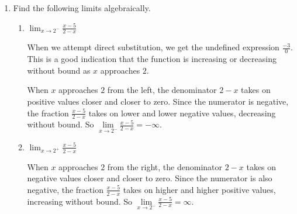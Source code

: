 \documentclass{article}
\begin{document}
\begin{enumerate}[resume]
\begin{solution}
    When $x<0$, as $x$ takes on values closer and closer to zero,
    $\frac{1}{x}$ takes on lower and lower negative values, decreasing without bound.
    This tells us that $\lim\limits_{x \to 0^-} \frac{1}{x} = -\infty$.

    Since $\frac{1}{x}$ increases without bound as $x$ approaches zero from the right and 
    decreases without bound as $x$ approaches zero from the left,
    $\lim\limits_{x \to 0} \frac{1}{x}$ does not exist.
    
  \end{solution}

\item 

  Find the following limits algebraically.

    \begin{enumerate}
    \item
      \begin{problem}
        $\displaystyle \lim_{x \to 2^-} \frac{x - 5}{2 - x}$
      \end{problem}

      \begin{solution}
        When we attempt direct substitution, we get the undefined expression $\frac{-3}{0}$. 
        This is a good indication that the function is increasing or decreasing without bound
        as $x$ approaches $2$.
        
        When $x$ approaches $2$ from the left, the denominator $2-x$ takes on positive values closer
        and closer to zero.
        Since the numerator is negative, the fraction $\frac{x-5}{2-x}$ takes on lower
        and lower negative values, decreasing without bound. So $\lim\limits_{x \to 2^-} \frac{x-5}{2-x} = -\infty$.
      \end{solution}

    \item
      \begin{problem}
        $\displaystyle \lim_{x \to 2^+} \frac{x - 5}{2 - x}$
      \end{problem}

      \begin{solution}
        When $x$ approaches $2$ from the right, the denominator $2-x$ takes on negative values closer and
        closer to zero.
        Since the numerator is also negative, the fraction $\frac{x-5}{2-x}$ takes on higher and higher
        positive values, increasing without bound. So $\lim\limits_{x \to 2^-} \frac{x-5}{2-x} = \infty$.
      \end{solution}


\end{enumerate}
\end{enumerate}
\end{document}
